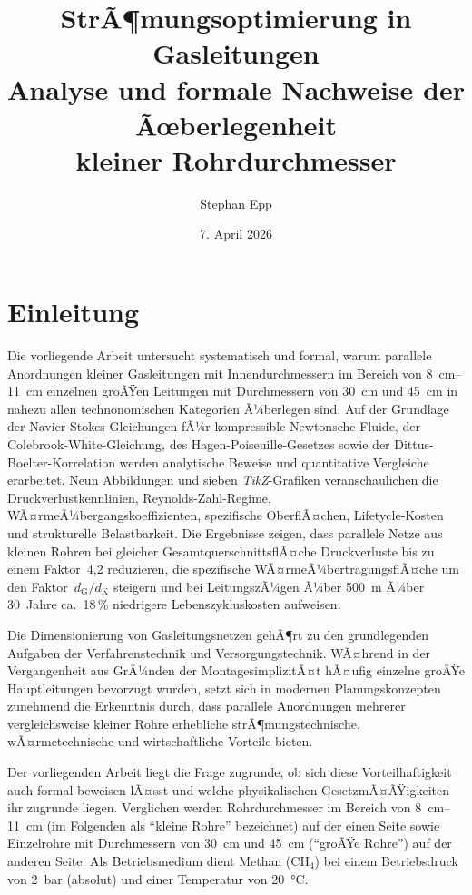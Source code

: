 ﻿\documentclass[12pt,a4paper,twoside]{article}
\title{{\bfseries StrÃ¶mungsoptimierung in Gasleitungen}\\[-0.1em]
  \Large Analyse und formale Nachweise der Ãœberlegenheit\\
  kleiner Rohrdurchmesser}
\author{Stephan Epp}
\date{7. April 2026}
\theoremstyle{plain}
\theoremstyle{definition}
\theoremstyle{remark}
\begin{document}

\maketitle
\tableofcontents
\newpage

\section{Einleitung}
\label{sec:einleitung}
Die vorliegende Arbeit untersucht systematisch und formal, warum parallele
Anordnungen kleiner Gasleitungen mit Innendurchmessern im Bereich von
\SIrange{8}{11}{\centi\metre} einzelnen groÃŸen Leitungen mit Durchmessern von
\SI{30}{\centi\metre} und \SI{45}{\centi\metre} in nahezu allen techno\-nomi\-schen
Kategorien Ã¼berlegen sind.
Auf der Grundlage der Navier-Stokes-Gleichungen fÃ¼r kompressible Newtonsche Fluide,
der Colebrook-White-Gleichung, des Hagen-Poiseuille-Gesetzes sowie der
Dittus-Boelter-Korrelation werden analytische Beweise und quantitative Vergleiche
erarbeitet.
Neun Abbildungen und sieben \textit{Ti\-kZ}-Grafiken veranschaulichen die
Druckverlustkennlinien, Reynolds-Zahl-Regime, WÃ¤rmeÃ¼bergangskoeffizienten,
spezifische OberflÃ¤chen, Lifetycle-Kosten und strukturelle Belastbarkeit.
Die Ergebnisse zeigen, dass parallele Netze aus kleinen Rohren bei gleicher
GesamtquerschnittsflÃ¤che Druck\-ver\-lus\-te bis zu einem Faktor~4{,}2 reduzieren,
die spezifische WÃ¤rmeÃ¼bertragungsflÃ¤che um den Faktor~$d_{\mathrm{G}}/d_{\mathrm{K}}$
steigern und bei LeitungszÃ¼gen Ã¼ber \SI{500}{\metre} Ã¼ber 30~Jahre ca.\ 18\,\%
niedrigere Lebenszykluskosten aufweisen.

Die Dimensionierung von Gasleitungsnetzen gehÃ¶rt zu den grundlegenden
Aufgaben der Verfahrenstechnik und Versorgungstechnik.
WÃ¤hrend in der Vergangenheit aus GrÃ¼nden der MontagesimplizitÃ¤t hÃ¤ufig
einzelne groÃŸe Hauptleitungen bevorzugt wurden, setzt sich in modernen
Planungskonzepten zunehmend die Erkenntnis durch, dass parallele
Anordnungen mehrerer vergleichsweise kleiner Rohre erhebliche
strÃ¶mungstechnische, wÃ¤rme\-technische und wirtschaftliche Vorteile bieten.

Der vorliegenden Arbeit liegt die Frage zugrunde, ob sich diese
Vorteilhaftigkeit auch formal beweisen lÃ¤sst und welche physikalischen
GesetzmÃ¤ÃŸigkeiten ihr zugrunde liegen.
Verglichen werden Rohrdurchmesser im Bereich von \SIrange{8}{11}{\centi\metre}
(im Folgenden als ``kleine Rohre'' bezeichnet) auf der einen Seite sowie
Einzelrohre mit Durchmessern von \SI{30}{\centi\metre} und \SI{45}{\centi\metre}
(``groÃŸe Rohre'') auf der anderen Seite.
Als Betriebsmedium dient Methan ($\mathrm{CH_4}$) bei einem Betriebsdruck von
\SI{2}{\bar} (absolut) und einer Temperatur von \SI{20}{\celsius}.
\end{document}
